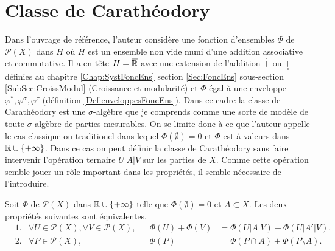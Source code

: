 \section{Classe de Carathéodory} \label{Sec:ClasseCaratheodory}
Dans l'ouvrage de référence, l'auteur considère une fonction d'ensembles $\Phi$ de $\mathcal{P}(X)$ dans $H$ où $H$ est un ensemble non vide muni d'une addition associative et commutative. Il a en tête $H = \overline{\mathbb{R}}$ avec une extension de l'addition $\overset{\circ}{+}$ ou $\underset{\circ}{+}$ définies au chapitre \ref{Chap:SystFoncEns} section \ref{Sec:FoncEns} sous-section \ref{SubSec:CroissModul} (Croissance et modularité) et $\Phi$ égal à une enveloppe $\varphi^*, \varphi^\sigma, \varphi^\tau$ (définition \ref{Def:enveloppesFoncEns}). Dans ce cadre la classe de Carathéodory est une $\sigma$-algèbre que je comprends comme une sorte de modèle de toute $\sigma$-algèbre de parties mesurables.\newline
On se limite donc à ce que l'auteur appelle le cas classique ou traditionel dans lequel $\Phi(\emptyset) = 0$ et $\Phi$ est à valeurs dans $\mathbb{R} \cup \left\lbrace + \infty \right\rbrace$. Dans ce cas on peut définir la classe de Carathéodory sans faire intervenir l'opération ternaire $U|A|V$ sur les parties de $X$. Comme cette opération semble jouer un rôle important dans les propriétés, il semble nécessaire de l'introduire.
\begin{prop}
 Soit $\Phi$ de $\mathcal{P}(X)$ dans $\mathbb{R} \cup \left\lbrace + \infty \right\rbrace$ telle que $\Phi(\emptyset) = 0$ et $A \subset X$. Les deux propriétés suivantes sont équivalentes.
 \begin{align*}
  &1.& \forall U \in \mathcal{P}(X), \forall V \in \mathcal{P}(X),& &\Phi(U) + \Phi(V) &= \Phi(U | A | V) + \Phi(U | A '| V).\\
  &2.& \forall P \in \mathcal{P}(X),&  &\Phi(P) &= \Phi(P \cap A) + \Phi(P \setminus A).
 \end{align*}
\end{prop}
